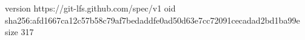 version https://git-lfs.github.com/spec/v1
oid sha256:afd1667ca12c57b58c79af7bedaddfe0ad50d63e7cc72091cecadad2bd1ba99e
size 317
